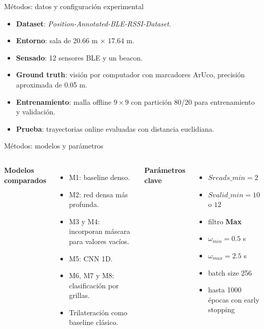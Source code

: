 \documentclass[aspectratio=169]{beamer}
\begin{document}
\begin{frame}{M\'etodos: datos y configuraci\'on experimental}
  \begin{itemize}
    \item \textbf{Dataset}: \textit{Position-Annotated-BLE-RSSI-Dataset}.
    \item \textbf{Entorno}: sala de 20.66 m \(\times\) 17.64 m.
    \item \textbf{Sensado}: 12 sensores BLE y un beacon.
    \item \textbf{Ground truth}: visi\'on por computador con marcadores ArUco, precisi\'on aproximada de 0.05 m.
    \item \textbf{Entrenamiento}: malla offline \(9 \times 9\) con partici\'on 80/20 para entrenamiento y validaci\'on.
    \item \textbf{Prueba}: trayectorias online evaluadas con distancia euclidiana.
  \end{itemize}
\end{frame}

\begin{frame}{M\'etodos: modelos y par\'ametros}
  \begin{columns}[T]
      \textbf{Modelos comparados}
      \begin{itemize}
        \item M1: baseline denso.
        \item M2: red densa m\'as profunda.
        \item M3 y M4: incorporan m\'ascara para valores vac\'ios.
        \item M5: CNN 1D.
        \item M6, M7 y M8: clasificaci\'on por grillas.
        \item Trilateraci\'on como baseline cl\'asico.
      \end{itemize}
      \textbf{Par\'ametros clave}
      \begin{itemize}
        \item \(Sreads\_min = 2\)
        \item \(Svalid\_min = 10\) o \(12\)
        \item filtro \textbf{Max}
        \item \(\omega_{min} = 0.5\) s
        \item \(\omega_{max} = 2.5\) s
        \item batch size 256
        \item hasta 1000 \'epocas con early stopping
      \end{itemize}
  \end{columns}
\end{frame}
\end{document}
